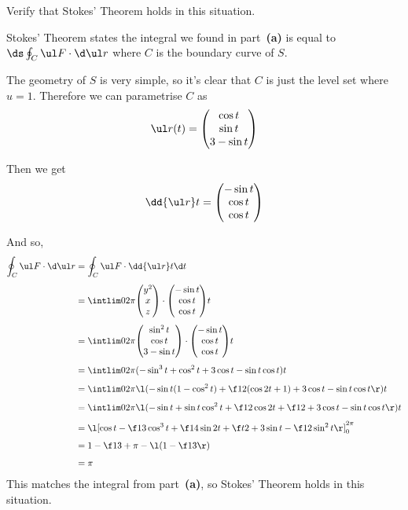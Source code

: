 \documentclass[a4paper]{article}
\begin{document}
\subsection{~} %

\begin{questionbody}
Verify that Stokes' Theorem holds in this situation.
\end{questionbody}

Stokes' Theorem states the integral we found in part~\textbf{(a)} is equal to $\ds \oint_C \ul F \cdot \d \ul r$ where $C$ is the boundary curve of $S$.

The geometry of $S$ is very simple, so it's clear that $C$ is just the level set where $u=1$. Therefore we can parametrise $C$ as $$\ul r(t) = \begin{pmatrix} \cos t \\ \sin t \\ 3 - \sin t \end{pmatrix}$$

Then we get $$\dd {\ul r}t = \begin{pmatrix} -\sin t \\ \cos t \\ \cos t \end{pmatrix}$$

And so, \begin{align*}
\oint_C \ul F \cdot \d \ul r &= \oint_C \ul F \cdot \dd {\ul r}t \d t\\[1ex]
&= \intlim 0{2\pi} {\begin{pmatrix} y^2 \\ x \\ z \end{pmatrix} \cdot \begin{pmatrix} -\sin t \\ \cos t \\ \cos t \end{pmatrix}} t\\[1ex]
&= \intlim 0{2\pi} {\begin{pmatrix} \sin^2 t \\ \cos t \\ 3 - \sin t \end{pmatrix} \cdot \begin{pmatrix} -\sin t \\ \cos t \\ \cos t \end{pmatrix}} t\\[1ex]
&= \intlim 0{2\pi} {(-\sin^3 t + \cos^2 t + 3 \cos t - \sin t \cos t)} t\\[1ex]
&= \intlim 0{2\pi} {\l( -\sin t (1 - \cos^2 t) + \f12 (\cos 2 t + 1) + 3 \cos t - \sin t \cos t \r)} t\\[1ex]
&= \intlim 0{2\pi} {\l( -\sin t + \sin t \cos^2 t + \f12 \cos 2 t + \f12 + 3 \cos t - \sin t \cos t \r)} t\\[1ex]
&= \l[ \cos t - \f13 \cos^3 t + \f14 \sin 2t + \f t2 + 3 \sin t - \f12 \sin^2 t \r]_0^{2\pi}\\[1ex]
&= 1 - \f13 + \pi - \l( 1 - \f13 \r)\\[1ex]
&= \pi
\end{align*}
This matches the integral from part~\textbf{(a)}, so Stokes' Theorem holds in this situation.
\end{document}
